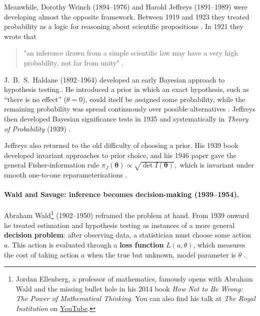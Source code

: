 Meanwhile, Dorothy Wrinch (1894--1976) and Harold Jeffreys (1891--1989) were developing almost the opposite framework. Between 1919 and 1923 they treated probability as a logic for reasoning about scientific propositions  \cite{wrinchjeffreys1919,wrinchjeffreys1921,wrinchjeffreys1923}. In 1921 they wrote that

\begin{quote}
"an inference drawn from a simple scientific law may have a very high
probability, not far from unity"
\cite[p.~380]{wrinchjeffreys1921}.
\end{quote}

J.~B.~S.~Haldane (1892--1964) developed an early Bayesian approach to hypothesis testing.. He introduced a prior in which an exact hypothesis, such as ``there is no effect'' ($\theta=0$), could itself be assigned some probability, while the remaining probability was spread continuously over possible alternatives \cite{haldane1932,etzwagenmakers2017}. Jeffreys then developed Bayesian significance tests in 1935 and systematically in \textit{Theory of Probability} (1939) \cite{jeffreys1935,jeffreys1939}.

Jeffreys also returned to the old difficulty of choosing a prior. His 1939 book developed invariant approaches to prior choice, and his 1946 paper gave the general Fisher-information rule $\pi_J(\boldsymbol{\theta}) \propto \sqrt{\det I(\boldsymbol{\theta})},$ which is invariant under smooth one-to-one reparameterisations \cite{jeffreys1939,jeffreys1946}.

\paragraph{Wald and Savage: inference becomes decision-making
(1939--1954).}

Abraham Wald\footnote{Jordan Ellenberg, a professor of mathematics, famously opens with Abraham Wald and the missing bullet hole in his 2014 book \textit{How Not to Be Wrong: The Power of Mathematical Thinking}. You can also find his talk at \textit{The Royal Institution} on \href{https://youtu.be/kZTKuMBJP7Y?si=1ar3FDNu2gL10LAG}{YouTube}.} (1902--1950) reframed the problem at hand. From 1939 onward he treated estimation and hypothesis testing as instances of a more general \textbf{decision problem}: after observing data, a statistician must choose some action $a$. This action is evaluated through a \textbf{loss function} $L(a,\theta)$, which measures the cost of taking action $a$ when the true but unknown, model parameter is $\theta$ \cite{wald1939,wald1950}.

